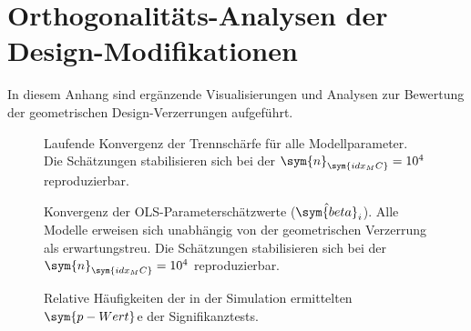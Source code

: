 
\section{Orthogonalitäts-Analysen der Design-Modifikationen}
\label{app:c}

In diesem Anhang sind ergänzende Visualisierungen und Analysen zur Bewertung der geometrischen Design-Verzerrungen aufgeführt.



%     


\begin{figure}[htbp]
    \centering
    \setlength{}
    \setlength\figureheight{16cm}
    
    \caption{Laufende Konvergenz der Trennschärfe für alle Modellparameter. Die Schätzungen stabilisieren sich bei der $\sym{n}_{\sym{idx_MC}}=10^4$ reproduzierbar.}
    \label{fig:app.c_conv_power}
\end{figure}

\begin{figure}[htbp]
    \centering
    \setlength{}
    \setlength\figureheight{16cm}
    
    \caption{Konvergenz der \ac{OLS}-Parameterschätzwerte ($\hat{\sym{beta}}_i$). Alle Modelle erweisen sich unabhängig von der geometrischen Verzerrung als erwartungstreu. Die Schätzungen stabilisieren sich bei der $\sym{n}_{\sym{idx_MC}}=10^4$ reproduzierbar.}
    \label{fig:app.c_conv_beta}
\end{figure}

\begin{figure}[htbp]
    \centering
    \setlength{}
    \setlength\figureheight{16cm}
    
    \caption{Relative Häufigkeiten der in der Simulation ermittelten $\sym{p-Wert}$e der Signifikanztests.}
    \label{fig:app.c_pval_hist}
\end{figure}

